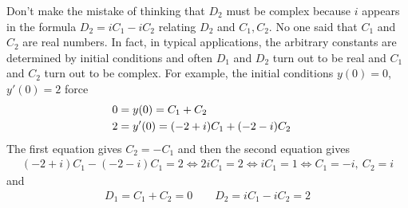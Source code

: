 \begin{eg}
Don't make the mistake of thinking that $D_2$ must be complex because 
$i$ appears in the formula $D_2=iC_1-iC_2$ relating $D_2$ and $C_1,C_2$. 
No one said that $C_1$ and $C_2$ are real numbers. In fact, 
in typical applications, the arbitrary constants are determined by 
initial conditions and often $D_1$ and $D_2$ turn out to be real and 
$C_1$ and $C_2$ turn out to be complex. 
For example, the initial conditions  $y(0)=0$, $y'(0)=2$ force
\begin{align*}
0&=y(0) = C_1 + C_2
\cr
2&=y'(0) = (-2+i)C_1 + (-2-i)C_2
\end{align*}
The first equation gives $C_2=-C_1$ and then the second equation gives
\begin{align*}
(-2+i)C_1 - (-2-i)C_1 = 2
\iff 2iC_1=2
\iff iC_1=1
\iff C_1=-i,\ C_2=i
\end{align*}
and
\begin{align*}
D_1=C_1+C_2=0\qquad
D_2=iC_1-iC_2=2
\end{align*}
\end{eg}

